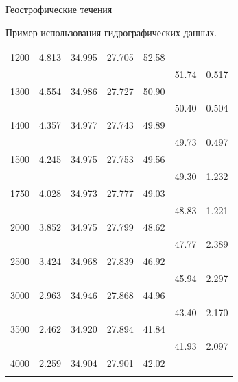 \begin{chapter}{Геострофические течения}
\begin{section}{Пример использования гидрографических данных.}
\begin{table}[t!]
\begin{small}
\begin{center}
\begin{tabular}{rrrrrrl}
1200&   4.813&  34.995& 27.705& 52.58&  \\
 &            &       &       &       & 51.74&  0.517\\
1300&   4.554&  34.986& 27.727& 50.90&  \\
 &            &       &       &       & 50.40&  0.504\\
1400&   4.357&  34.977& 27.743& 49.89&  \\
 &            &       &       &       & 49.73&  0.497\\
1500&   4.245&  34.975& 27.753& 49.56&  \\
 &            &       &       &       & 49.30&  1.232\\
1750&   4.028&  34.973& 27.777& 49.03&  \\
 &            &       &       &       & 48.83&  1.221\\
2000&   3.852&  34.975& 27.799& 48.62&  \\
 &            &       &       &       & 47.77&  2.389\\
2500&   3.424&  34.968& 27.839& 46.92&  \\
 &            &       &       &       & 45.94&  2.297\\
3000&   2.963&  34.946& 27.868& 44.96&  \\
 &            &       &       &       & 43.40&  2.170\\
3500&   2.462&  34.920& 27.894& 41.84&  \\
 &            &       &       &       & 41.93&  2.097\\
4000&   2.259&  34.904& 27.901& 42.02 \\
\rule[-1ex]{0mm}{1ex}&  \\
\hline
\end{tabular} \\
\end{center}
\end{small}
\end{table}


\end{section}
\end{chapter}
